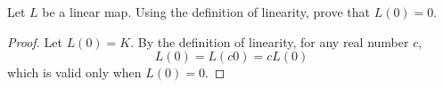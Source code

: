 \documentclass{ximera}
\begin{document}
\begin{exercise} \label{c4.3.11}
Let $L$ be a linear map.  Using the definition of linearity,
prove that $L(0)=0$.

\begin{solution}
\begin{proof}
Let $L(0) = K$.
By the definition of linearity, for any real number $c$,
\[ L(0) = L(c0) = cL(0) \]
which is valid only when $L(0) = 0$.
\end{proof}
\end{solution}
\end{exercise}
\end{document}
